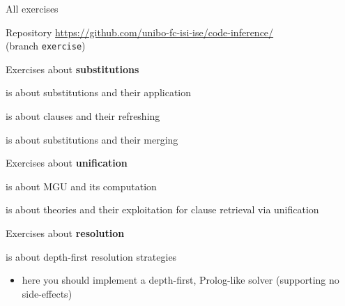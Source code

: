 \documentclass[presentation]{beamer}\mode<presentation>{\usetheme{AMSBolognaFC}}
\begin{document}
\begin{frame}[allowframebreaks]{All exercises}

    \begin{alertblock}{Repository}
        \centering
        \url{https://github.com/unibo-fc-isi-ise/code-inference/}
        \\
        (branch \texttt{exercise})
    \end{alertblock}

    \begin{block}{Exercises about \textbf{substitutions}}
        \label{slide:ex-sub}
        \begin{description}
            \startExercise
            \item[\currentExercise] is about substitutions and their application
            \startExercise
            \item[\currentExercise] is about clauses and their refreshing
            \startExercise
            \item[\currentExercise] is about substitutions and their merging
        \end{description}
    \end{block}
    \begin{block}{Exercises about \textbf{unification}}
        \label{slide:ex-uni}
        \begin{description}
            \startExercise
            \item[\currentExercise] is about MGU and its computation
            \startExercise
            \item[\currentExercise] is about theories and their exploitation for clause retrieval via unification
        \end{description}
    \end{block}
    \begin{block}{Exercises about \textbf{resolution}}
        \label{slide:ex-res}
        \begin{description}
            \startExercise
            \item[\currentExercise] is about depth-first resolution strategies
            \begin{itemize}
                \item here you should implement a depth-first, Prolog-like solver (supporting no side-effects)
            \end{itemize}


\end{description}
\end{block}
\end{frame}
\end{document}
